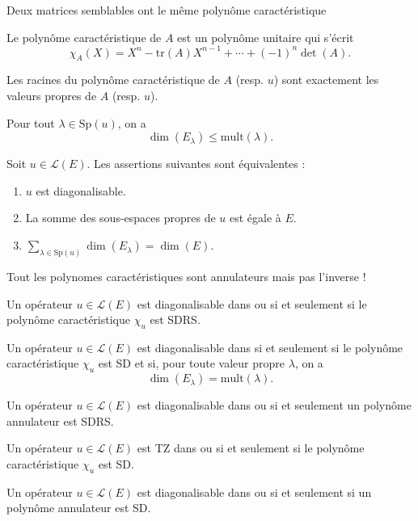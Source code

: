 \documentclass{article}
\begin{document}
\begin{itemize}[label=$\ast$]
\begin{center}
\item Deux matrices semblables ont le même polynôme caractéristique

\item Le polynôme caractéristique de \(A\) est un polynôme unitaire qui s'écrit \[\chi_A(X) = X^n - \text{tr}(A)X^{n-1} + \cdots + (-1)^n\det(A).\]

\item Les racines du polynôme caractéristique de $A$ (resp. $u$) sont exactement les valeurs propres de $A$ (resp. $u$).

\item Pour tout $\lambda \in \text{Sp}(u)$, on a \[\dim(E_{\lambda}) \leq \text{mult}(\lambda).\]

\item Soit $u \in \mathcal{L}(E)$. Les assertions suivantes sont équivalentes :
\begin{enumerate}
    \item $u$ est diagonalisable.
    \item La somme des sous-espaces propres de $u$ est égale à $E$.
    \item $\sum_{\lambda \in \text{Sp}(u)} \dim(E_{\lambda}) = \dim(E)$.
\end{enumerate}

\begin{center}
Tout les polynomes caractéristiques sont annulateurs mais pas l'inverse !
\end{center}

\item Un opérateur $u \in \mathcal{L}(E)$ est diagonalisable dans  ou  si et seulement si le polynôme caractéristique $\chi_u$ est SDRS.

\item Un opérateur $u \in \mathcal{L}(E)$ est diagonalisable dans  si et seulement si le polynôme caractéristique $\chi_u$ est SD et si, pour toute valeur propre $\lambda$, on a \[\dim(E_{\lambda}) = \text{mult}(\lambda).\]

\item Un opérateur $u \in \mathcal{L}(E)$ est diagonalisable dans  ou  si et seulement un polynôme annulateur est SDRS.

\item Un opérateur $u \in \mathcal{L}(E)$ est TZ dans  ou  si et seulement si le polynôme caractéristique $\chi_u$ est SD.

\item Un opérateur $u \in \mathcal{L}(E)$ est diagonalisable dans  ou  si et seulement si un polynôme annulateur est SD.


\end{center}
\end{itemize}
\end{document}
